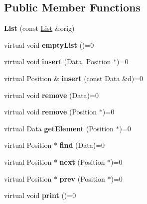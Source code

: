 \subsection*{Public Member Functions}
\begin{DoxyCompactItemize}
\item 
\mbox{\label{class_list_a57165b01e9b6e343ec2fd429b55845f1}} 
{\bfseries List} (const \hyperlink{class_list}{List} \&orig)
\item 
\mbox{\label{class_list_a65dcd9c5a33efd66cb3b7150fbc57c72}} 
virtual void {\bfseries empty\+List} ()=0
\item 
\mbox{\label{class_list_ab552cf8902976826d52ab13ea38929fc}} 
virtual void {\bfseries insert} (Data, Position $\ast$)=0
\item 
\mbox{\label{class_list_a278f3ff956301318ec26d4a351373194}} 
virtual Position \& {\bfseries insert} (const Data \&d)=0
\item 
\mbox{\label{class_list_a5addfe02246a4a6f719f8bac1d5bd1aa}} 
virtual void {\bfseries remove} (Data)=0
\item 
\mbox{\label{class_list_a501e8ae849d67cd686f0c0a3d9f7992f}} 
virtual void {\bfseries remove} (Position $\ast$)=0
\item 
\mbox{\label{class_list_af4bd172754a3e06a3a356b389065bdc7}} 
virtual Data {\bfseries get\+Element} (Position $\ast$)=0
\item 
\mbox{\label{class_list_ad6cc8750b1bd313747547ce94c8fbea4}} 
virtual Position $\ast$ {\bfseries find} (Data)=0
\item 
\mbox{\label{class_list_a6e3479313c8ce725def4e36a5540ea7c}} 
virtual Position $\ast$ {\bfseries next} (Position $\ast$)=0
\item 
\mbox{\label{class_list_aab5e1a4acb9997e8bb406e8fdb4eabb9}} 
virtual Position $\ast$ {\bfseries prev} (Position $\ast$)=0
\item 
\mbox{\label{class_list_ab9f8e23dd4cfee4122602b3724af7812}} 
virtual void {\bfseries print} ()=0
\end{DoxyCompactItemize}
